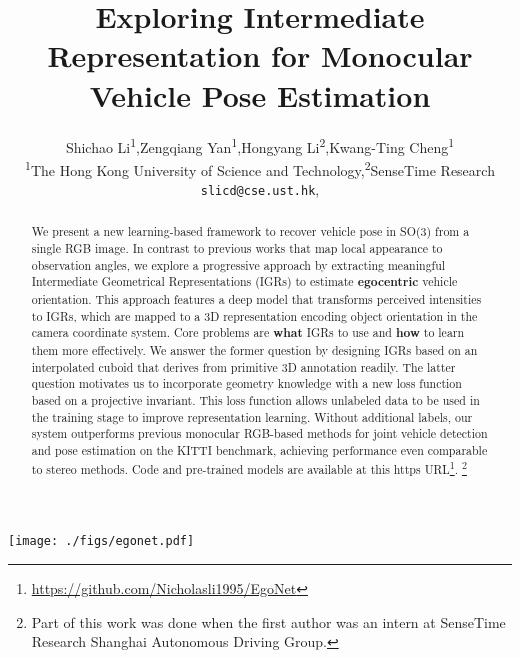 \documentclass[final]{cvpr}
\title{Exploring Intermediate Representation for Monocular Vehicle Pose Estimation}
\author{Shichao Li\textsuperscript{1},\quad Zengqiang Yan\textsuperscript{1},\quad Hongyang Li\textsuperscript{2},\quad Kwang-Ting Cheng\textsuperscript{1}\\
	\textsuperscript{1}The Hong Kong University of Science and Technology,\quad  \textsuperscript{2}SenseTime Research \\ {\tt\small slicd@cse.ust.hk},
	\quad{\tt\small timcheng@ust.hk}
}
\begin{document}

\begin{abstract}  
We present a new learning-based framework to recover vehicle pose in SO(3) from a single RGB image. In contrast to previous works that map local appearance to observation angles, we explore a progressive approach by extracting meaningful Intermediate Geometrical Representations (IGRs) to estimate \textbf{egocentric} vehicle orientation. This approach features a deep model that transforms perceived intensities to IGRs, which are mapped to a 3D representation encoding object orientation in the camera coordinate system. Core problems are \textbf{what} IGRs to use and \textbf{how} to learn them more effectively. We answer the former question by designing IGRs based on an interpolated cuboid that derives from primitive 3D annotation readily. The latter question motivates us to incorporate geometry knowledge with a new loss function based on a projective invariant. This loss function allows unlabeled data to be used in the training stage to improve representation learning. Without additional labels, our system outperforms previous monocular RGB-based methods for joint vehicle detection and pose estimation on the KITTI benchmark, achieving performance even comparable to stereo methods. Code and pre-trained models are available at this https URL\footnote{\url{https://github.com/Nicholasli1995/EgoNet}}. {\let\thefootnote\relax\footnote{{Part of this work was done when the first author was an intern at SenseTime Research Shanghai Autonomous Driving Group.}}}
\end{abstract}
\begin{figure*}[t]
	\begin{center}
		\texttt{[image: ./figs/egonet.pdf]}
	\end{center}
	\caption{Detailed architecture of Ego-Net. Feature maps are first computed with a fully convolution model  from a detected instance. Heatmaps representing the projection of a 3D cuboid are regressed and mapped to local coordinates with several strided convolution layers. The local coordinates are transformed to screen coordinates  and mapped to a 3D cuboid representation , whose orientation directly represent egocentric pose in the camera coordinate system. k=33 when q=2 as in Sec. \ref{MA}.}
	\label{fig:egonet}
\end{figure*}
\end{document}
